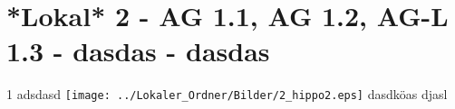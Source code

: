\section{*Lokal* 2 - AG 1.1, AG 1.2, AG-L 1.3 - dasdas - dasdas}

\begin{langesbeispiel} \item[1] %
adsdasd
\texttt{[image: ../Lokaler\_Ordner/Bilder/2\_hippo2.eps]}
dasdköas
djasl

\end{langesbeispiel}